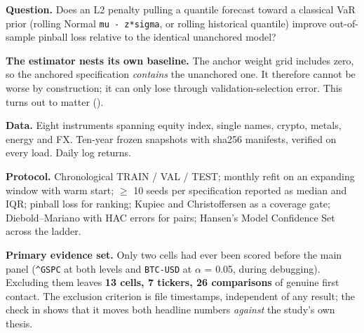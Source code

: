 \textbf{Question.} Does an L2 penalty pulling a quantile forecast toward a classical VaR prior
(rolling Normal \texttt{mu\ -\ z*sigma}, or rolling historical quantile) improve out-of-sample pinball
loss relative to the identical unanchored model?

\textbf{The estimator nests its own baseline.} The anchor weight grid includes zero, so the anchored
specification \emph{contains} the unanchored one. It therefore cannot be worse by construction; it
can only lose through validation-selection error. This turns out to matter ().

\textbf{Data.} Eight instruments spanning equity index, single names, crypto, metals, energy and FX.
Ten-year frozen snapshots with sha256 manifests, verified on every load. Daily log returns.

\textbf{Protocol.} Chronological TRAIN / VAL / TEST; monthly refit on an expanding window with warm
start; $\geq$ 10 seeds per specification reported as median and IQR; pinball loss for ranking;
Kupiec and Christoffersen as a coverage gate; Diebold--Mariano with HAC errors for pairs;
Hansen's Model Confidence Set across the ladder.

\textbf{Primary evidence set.} Only two cells had ever been scored before the main panel
(\texttt{\^{}GSPC} at both levels and \texttt{BTC-USD} at $\alpha$ = 0.05, during debugging). Excluding them leaves
\textbf{13 cells, 7 tickers, 26 comparisons} of genuine first contact. The exclusion criterion is
file timestamps, independent of any result; the check in  shows that it moves both headline
numbers \emph{against} the study's own thesis.
